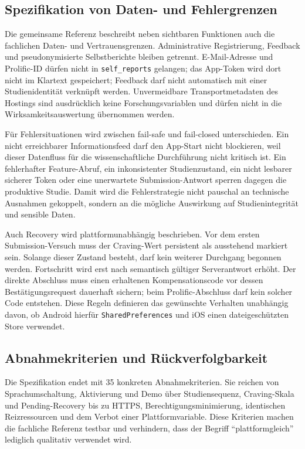 \begin{neu}
\subsection{Spezifikation von Daten- und Fehlergrenzen}

Die gemeinsame Referenz beschreibt neben sichtbaren Funktionen auch die fachlichen Daten- und Vertrauensgrenzen. Administrative Registrierung, Feedback und pseudonymisierte Selbstberichte bleiben getrennt. E-Mail-Adresse und Prolific-ID dürfen nicht in \texttt{self\_reports} gelangen; das App-Token wird dort nicht im Klartext gespeichert; Feedback darf nicht automatisch mit einer Studienidentität verknüpft werden. Unvermeidbare Transportmetadaten des Hostings sind ausdrücklich keine Forschungsvariablen und dürfen nicht in die Wirksamkeitsauswertung übernommen werden.

Für Fehlersituationen wird zwischen fail-safe und fail-closed unterschieden. Ein nicht erreichbarer Informationsfeed darf den App-Start nicht blockieren, weil dieser Datenfluss für die wissenschaftliche Durchführung nicht kritisch ist. Ein fehlerhafter Feature-Abruf, ein inkonsistenter Studienzustand, ein nicht lesbarer sicherer Token oder eine unerwartete Submission-Antwort sperren dagegen die produktive Studie. Damit wird die Fehlerstrategie nicht pauschal an technische Ausnahmen gekoppelt, sondern an die mögliche Auswirkung auf Studienintegrität und sensible Daten.

Auch Recovery wird plattformunabhängig beschrieben. Vor dem ersten Submission-Versuch muss der Craving-Wert persistent als ausstehend markiert sein. Solange dieser Zustand besteht, darf kein weiterer Durchgang begonnen werden. Fortschritt wird erst nach semantisch gültiger Serverantwort erhöht. Der direkte Abschluss muss einen erhaltenen Kompensationscode vor dessen Bestätigungsrequest dauerhaft sichern; beim Prolific-Abschluss darf kein solcher Code entstehen. Diese Regeln definieren das gewünschte Verhalten unabhängig davon, ob Android hierfür \texttt{SharedPreferences} und iOS einen dateigeschützten Store verwendet.

\subsection{Abnahmekriterien und Rückverfolgbarkeit}

Die Spezifikation endet mit 35 konkreten Abnahmekriterien. Sie reichen von Sprachumschaltung, Aktivierung und Demo über Studiensequenz, Craving-Skala und Pending-Recovery bis zu HTTPS, Berechtigungsminimierung, identischen Reizressourcen und dem Verbot einer Plattformvariable. Diese Kriterien machen die fachliche Referenz testbar und verhindern, dass der Begriff ``plattformgleich'' lediglich qualitativ verwendet wird.


\end{neu}
